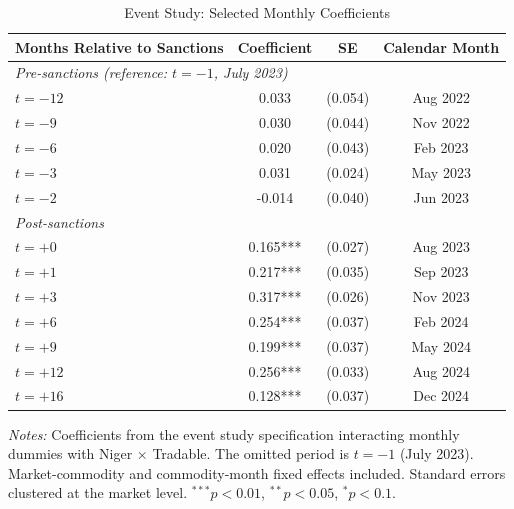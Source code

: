 \begin{table}[htbp]
\centering
\caption{Event Study: Selected Monthly Coefficients}
\label{tab:eventstudy}
\begin{tabular}{lccc}
\toprule
Months Relative to Sanctions & Coefficient & SE & Calendar Month \\
\midrule
\multicolumn{4}{l}{\textit{Pre-sanctions (reference: $t = -1$, July 2023)}} \\
$t = -12$ & 0.033 & (0.054) & Aug 2022 \\
$t = -9$ & 0.030 & (0.044) & Nov 2022 \\
$t = -6$ & 0.020 & (0.043) & Feb 2023 \\
$t = -3$ & 0.031 & (0.024) & May 2023 \\
$t = -2$ & -0.014 & (0.040) & Jun 2023 \\
\midrule
\multicolumn{4}{l}{\textit{Post-sanctions}} \\
$t = +0$ & 0.165*** & (0.027) & Aug 2023 \\
$t = +1$ & 0.217*** & (0.035) & Sep 2023 \\
$t = +3$ & 0.317*** & (0.026) & Nov 2023 \\
$t = +6$ & 0.254*** & (0.037) & Feb 2024 \\
$t = +9$ & 0.199*** & (0.037) & May 2024 \\
$t = +12$ & 0.256*** & (0.033) & Aug 2024 \\
$t = +16$ & 0.128*** & (0.037) & Dec 2024 \\
\bottomrule
\end{tabular}
\begin{tablenotes}
\item \textit{Notes:} Coefficients from the event study specification interacting monthly dummies with Niger $\times$ Tradable. The omitted period is $t = -1$ (July 2023). Market-commodity and commodity-month fixed effects included. Standard errors clustered at the market level. $^{***}p<0.01$, $^{**}p<0.05$, $^{*}p<0.1$.
\end{tablenotes}
\end{table}

